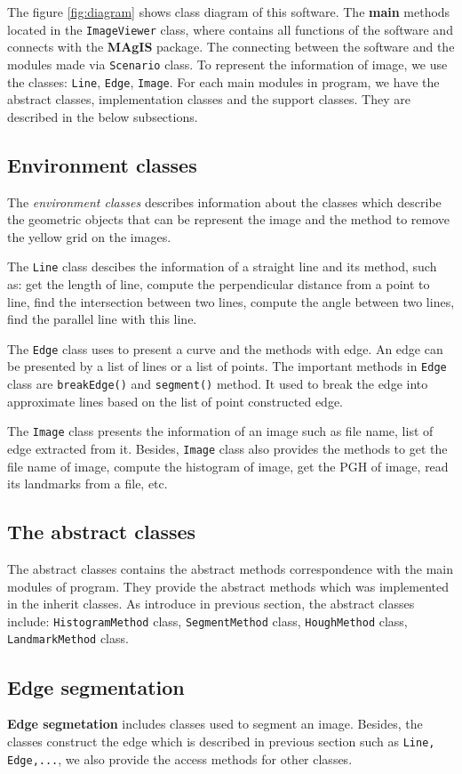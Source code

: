The figure \ref{fig:diagram} shows class diagram of this software. The \textbf{main} methods located in the \texttt{ImageViewer} class, where contains all functions of the software and connects with the \textbf{MAgIS} package. The connecting between the software and the modules made via \texttt{Scenario} class. To represent the information of image, we use the classes: \texttt{Line}, \texttt{Edge}, \texttt{Image}. For each main modules in program, we have the abstract classes, implementation classes and the support classes. They are described in the below subsections.
\subsection*{Environment classes}
The \textit{environment classes} describes information about the classes which describe the geometric objects that can be represent the image and the method to remove the yellow grid on the images.

The \texttt{Line} class descibes the information of a straight line and its method, such as: get the length of line, compute the perpendicular distance from a point to line, find the intersection between two lines, compute the angle between two lines, find the parallel line with this line.

The \texttt{Edge} class uses to present a curve and the methods with edge. An edge can be presented by a list of lines or a list of points. The important methods in \texttt{Edge} class are \texttt{breakEdge()} and \texttt{segment()} method. It used to break the edge into approximate lines based on the list of point constructed edge.

The \texttt{Image} class presents the information of an image such as file name, list of edge extracted from it. Besides, \texttt{Image} class also provides the methods to get the file name of image, compute the histogram of image, get the PGH of image, read its landmarks from a file, etc.
\subsection*{The abstract classes}
The abstract classes contains the abstract methods correspondence with the main modules of program. They provide the abstract methods which was implemented in the inherit classes. As introduce in previous section, the abstract classes include: \texttt{HistogramMethod} class, \texttt{SegmentMethod} class, \texttt{HoughMethod} class, \texttt{LandmarkMethod} class.
\subsection{Edge segmentation }
\textbf{Edge segmetation} includes classes used to segment an image. Besides, the classes construct the edge which is described in previous section such as \texttt{Line, Edge,...}, we also provide the access methods for other classes.

